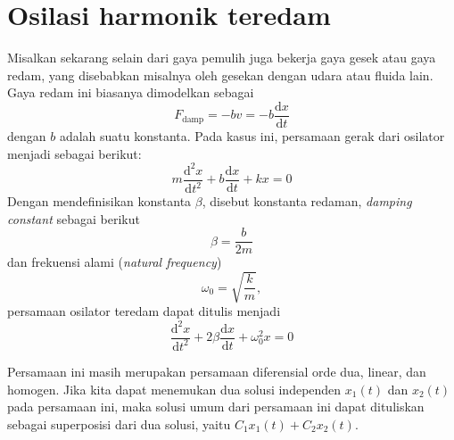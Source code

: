 \section{Osilasi harmonik teredam}

Misalkan sekarang selain dari gaya pemulih juga
bekerja gaya gesek atau gaya redam, yang disebabkan misalnya oleh
gesekan dengan udara atau fluida lain.
Gaya redam ini biasanya dimodelkan sebagai
\begin{equation}
F_{\mathrm{damp}} = -bv = -b\frac{\mathrm{d}x}{\mathrm{d}t}
\end{equation}
dengan $b$ adalah suatu konstanta.
Pada kasus ini, persamaan gerak dari osilator menjadi sebagai berikut:
\begin{equation}
m\frac{\mathrm{d}^{2}x}{\mathrm{d}t^{2}}+b\frac{\mathrm{d}x}{\mathrm{d}t}+kx=0
\end{equation}
Dengan mendefinisikan konstanta $\beta$, disebut konstanta redaman, \emph{damping constant}
sebagai berikut
\begin{equation}
\beta = \frac{b}{2m}
\end{equation}
dan frekuensi alami (\emph{natural frequency})
\begin{equation}
\omega_{0}=\sqrt{\frac{k}{m}},
\end{equation}
persamaan osilator teredam dapat ditulis menjadi
\begin{equation}
\frac{\mathrm{d}^{2}x}{\mathrm{d}t^{2}} + 2\beta \frac{\mathrm{d}x}{\mathrm{d}t} + \omega_{0}^{2}x = 0
\label{eq:Taylor_5_28}
\end{equation}

Persamaan ini masih merupakan persamaan diferensial orde dua, linear,
dan homogen. Jika kita dapat menemukan dua solusi independen $x_{1}(t)$
dan $x_{2}(t)$ pada persamaan ini, maka solusi umum dari persamaan
ini dapat dituliskan sebagai superposisi dari dua solusi, yaitu $C_{1}x_{1}(t)+C_{2}x_{2}(t)$.

